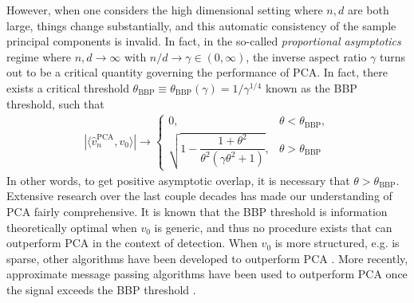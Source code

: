 \documentclass[12pt]{article}
\newcommand{\BBP}{\text{BBP}}
\newcommand{\PCA}{\text{PCA}}
\begin{document}
However, when one considers the high dimensional setting where $n,d$ are both large, things change substantially, and this automatic consistency of the sample principal components is invalid. In fact, in the so-called \textit{proportional asymptotics} regime where $n,d\to\infty$ with $n/d\to \gamma\in (0,\infty)$, the inverse aspect ratio $\gamma$ turns out to be a critical quantity governing the performance of PCA. In fact, there exists a critical threshold $\theta_{\text{BBP}}\equiv\theta_\BBP(\gamma)= 1/\gamma^{1/4}$ \citep{baikbenarouspeche,benaych2011eigenvalues} known as the BBP threshold, such that
\begin{align}\label{eqn:bbp}
    |\langle \hat v_n^\PCA,v_0\rangle|\to \begin{cases}
        0, & \theta < \theta_{\text{BBP}}, \\
        \sqrt{1 - \dfrac{1+\theta^2}{\theta^2(\gamma\theta^2+1)}}, & \theta > \theta_{\text{BBP}}
    \end{cases}
\end{align}In other words, to get positive asymptotic overlap, it is necessary that $\theta>\theta_{\text{BBP}}$. Extensive research over the last couple decades \citep{johnstone2001distribution,baikbenarouspeche,benaych2011eigenvalues,benaych2012singular,johnstone2018pca,perry2018optimality} has made our understanding of PCA fairly comprehensive. It is known that the BBP threshold is information theoretically optimal \citep{perry2018optimality} when $v_0$ is generic, and thus no procedure exists that can outperform PCA in the context of detection. When $v_0$ is more structured, e.g. is sparse, other algorithms have been developed to outperform PCA \citep{johnstone2009consistency,amini2008high,deshpande2016sparse,deshpande2014information}. More recently, approximate message passing algorithms have been used to outperform PCA once the signal exceeds the BBP threshold \citep{MontanariVenkataraman,LiFanWei}.
\end{document}
